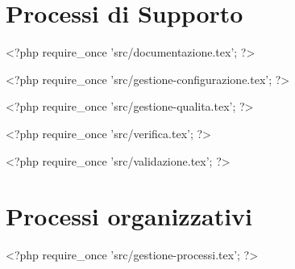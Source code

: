 \documentclass[a4paper, 11pt]{article}
\begin{document}
\section{Processi di Supporto}

<?php require_once 'src/documentazione.tex'; ?>

<?php require_once 'src/gestione-configurazione.tex'; ?>

<?php require_once 'src/gestione-qualita.tex'; ?>


<?php require_once 'src/verifica.tex'; ?>

<?php require_once 'src/validazione.tex'; ?>
\pagebreak

\section{Processi organizzativi}

<?php require_once 'src/gestione-processi.tex'; ?>
\end{document}
